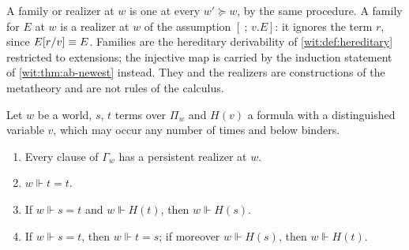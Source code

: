 A family or realizer at $w$ is one at every $w'\succeq w$, by the same
procedure.  A family for $E$ at $w$ is a realizer at $w$ of the assumption
$[\ ;\,v.E]$: it ignores the term $r$, since $E[r/v]\equiv E$.
Families are the hereditary derivability of \cref{wit:def:hereditary}
restricted to extensions; the injective map is carried by the induction
statement of \cref{wit:thm:ab-newest} instead.  They and the realizers are
constructions of the metatheory and are not rules of the calculus.

\begin{lemma}
\label{wit:lem:ab-eq}
Let $w$ be a world, $s$, $t$ terms over $\Pi_w$ and $H(v)$ a formula with a
distinguished variable $v$, which may occur any number of times and below
binders.
\begin{enumerate}[label=\textup{(\roman*)}]
\item Every clause of $\Gamma_w$ has a persistent realizer at $w$.
\item $w\Vdash t=t$.
\item If $w\Vdash s=t$ and $w\Vdash H(t)$, then $w\Vdash H(s)$.
\item If $w\Vdash s=t$, then $w\Vdash t=s$; if moreover $w\Vdash H(s)$,
 then $w\Vdash H(t)$.
\end{enumerate}
\end{lemma}

